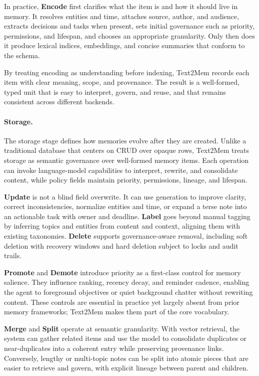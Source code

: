 \documentclass[conference]{IEEEtran}
\begin{document}
In practice, \textbf{Encode} first clarifies what the item is and how it should live in memory. It resolves entities and time, attaches source, author, and audience, extracts decisions and tasks when present, sets initial governance such as priority, permissions, and lifespan, and chooses an appropriate granularity. Only then does it produce lexical indices, embeddings, and concise summaries that conform to the schema. 

By treating encoding as understanding before indexing, Text2Mem records each item with clear meaning, scope, and provenance. The result is a well-formed, typed unit that is easy to interpret, govern, and reuse, and that remains consistent across different backends. 



\paragraph{Storage.}

The storage stage defines how memories evolve after they are created. 
Unlike a traditional database that centers on CRUD over opaque rows, Text2Mem treats storage as semantic governance over well-formed memory items. 
Each operation can invoke language-model capabilities to interpret, rewrite, and consolidate content, while policy fields maintain priority, permissions, lineage, and lifespan.

\textbf{Update} is not a blind field overwrite. It can use generation to improve clarity, correct inconsistencies, normalize entities and time, or expand a terse note into an actionable task with owner and deadline. 
\textbf{Label} goes beyond manual tagging by inferring topics and entities from content and context, aligning them with existing taxonomies. 
\textbf{Delete} supports governance-aware removal, including soft deletion with recovery windows and hard deletion subject to locks and audit trails. 

\textbf{Promote} and \textbf{Demote} introduce priority as a first-class control for memory salience. They influence ranking, recency decay, and reminder cadence, enabling the agent to foreground objectives or quiet background chatter without rewriting content. 
These controls are essential in practice yet largely absent from prior memory frameworks; Text2Mem makes them part of the core vocabulary. 

\textbf{Merge} and \textbf{Split} operate at semantic granularity. 
With vector retrieval, the system can gather related items and use the model to consolidate duplicates or near-duplicates into a coherent entry while preserving provenance links. 
Conversely, lengthy or multi-topic notes can be split into atomic pieces that are easier to retrieve and govern, with explicit lineage between parent and children. 
\end{document}

